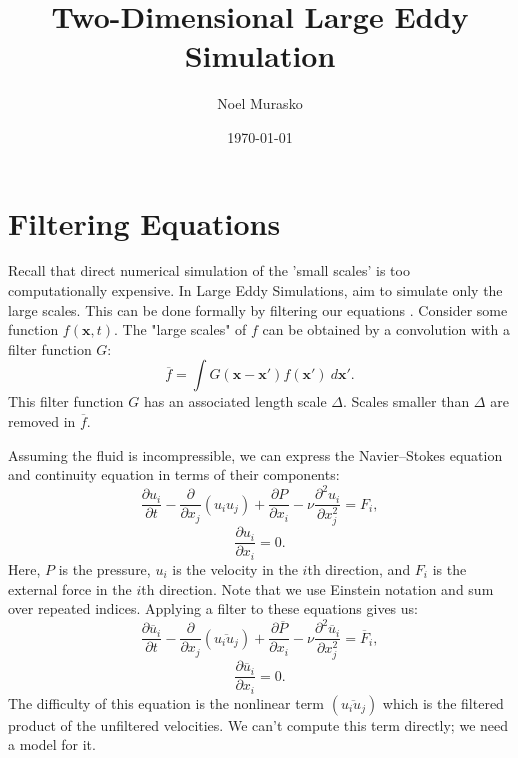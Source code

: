 \documentclass[11pt,a4paper]{article}
\author{Noel Murasko}
\title{Two-Dimensional Large Eddy Simulation}
\date{\today}
\begin{document}
\maketitle
\noindent 
\section{Filtering Equations}
Recall that direct numerical simulation of the 'small scales' is too computationally expensive. In Large Eddy Simulations, aim to simulate only the large scales. This can be done formally by filtering our equations \cite{Leonard1974}. Consider some function $f(\boldsymbol{x}, t)$. The "large scales" of $f$ can be obtained by a convolution with a filter function $G$:
$$\overline{f} = \int G(\boldsymbol{x} - \boldsymbol{x}')f(\boldsymbol{x}')\ d\boldsymbol{x}'.$$
This filter function $G$ has an associated length scale $\Delta$. Scales smaller than $\Delta$ are removed in $\overline{f}$. 

Assuming the fluid is incompressible, we can express the Navier--Stokes equation and continuity equation in terms of their components:
$$\frac{\partial u_i}{\partial t} - \frac{\partial }{\partial x_j}(u_iu_j)+\frac{\partial P}{\partial x_i}- \nu \frac{\partial^2u_i}{\partial x_j^2} = F_i,$$
$$\frac{\partial u_i}{\partial x_i}  =0.$$
Here, $P$ is the pressure, $u_i$ is the velocity in the $i$th direction, and $F_i$ is the external force in the $i$th direction. Note that we use Einstein notation and sum over repeated indices. Applying a filter to these equations gives us:
$$\frac{\partial \overline{u}_i}{\partial t} - \frac{\partial }{\partial x_j}\left(\overline{u_iu_j}\right)+\frac{\partial \overline{P}}{\partial x_i}- \nu \frac{\partial^2\overline{u}_i}{\partial x_j^2}= \overline{F}_i,$$
$$\frac{\partial \overline{u}_i}{\partial x_i}  =0.$$
The difficulty of this equation is the nonlinear term $\left(\overline{u_iu_j}\right)$ which is the filtered product of the unfiltered velocities. We can't compute this term directly; we need a model for it.
\end{document}
